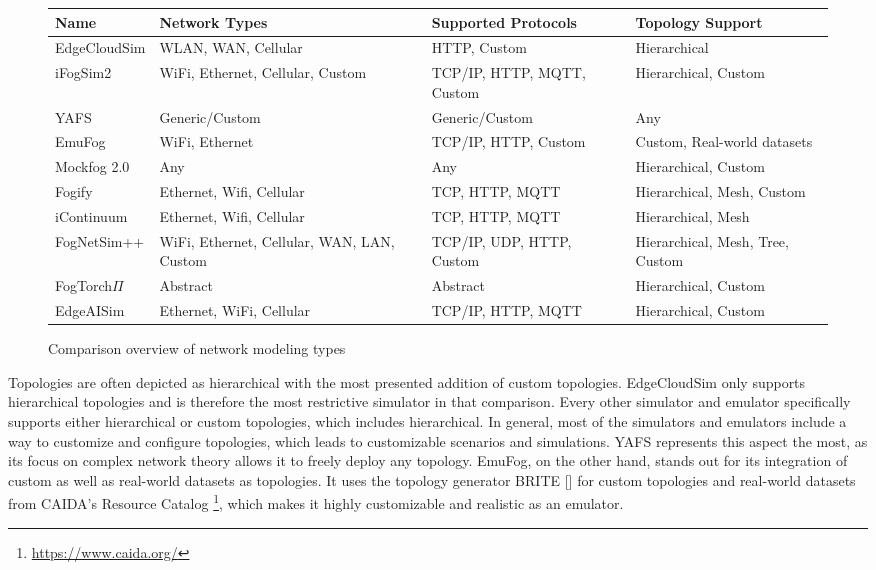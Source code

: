 \begin{figure}[H]
  \centering
  \begin{tabularx}{\textwidth}{ l | X | X | X  }
    \hline
    \textbf{Name} & \textbf{Network Types} & \textbf{Supported Protocols} & \textbf{Topology Support}\\
    \hline\hline
    EdgeCloudSim  & WLAN, WAN, Cellular                         & HTTP, Custom                            & Hierarchical \\\hline
    iFogSim2      & WiFi, Ethernet, Cellular, Custom            & TCP/IP, HTTP, MQTT, Custom              & Hierarchical, Custom\\\hline
    YAFS          & Generic/Custom                              & Generic/Custom                          & Any \\\hline
    EmuFog        & WiFi, Ethernet                              & TCP/IP, HTTP, Custom                    & Custom, Real-world datasets\\\hline
    Mockfog 2.0   & Any                                         & Any                                     & Hierarchical, Custom \\\hline
    Fogify        & Ethernet, Wifi, Cellular                    & TCP, HTTP, MQTT                         & Hierarchical, Mesh, Custom \\\hline
    iContinuum    & Ethernet, Wifi, Cellular                    & TCP, HTTP, MQTT                         & Hierarchical, Mesh \\\hline
    FogNetSim++   & WiFi, Ethernet, Cellular, WAN, LAN, Custom  & TCP/IP, UDP, HTTP, Custom               & Hierarchical, Mesh, Tree, Custom \\\hline
    FogTorch$\Pi$ & Abstract                                    & Abstract                                & Hierarchical, Custom \\\hline
    EdgeAISim     & Ethernet, WiFi, Cellular                    & TCP/IP, HTTP, MQTT                      & Hierarchical, Custom \\\hline
  \end{tabularx}
  \caption{Comparison overview of network modeling types}
  \label{tab:analysis-network-modeling-types}
\end{figure}

Topologies are often depicted as hierarchical with the most presented addition of custom topologies.
EdgeCloudSim only supports hierarchical topologies and is therefore the most restrictive simulator in that comparison.
Every other simulator and emulator specifically supports either hierarchical or custom topologies, which includes hierarchical.
In general, most of the simulators and emulators include a way to customize and configure topologies, which leads to customizable scenarios and simulations.
YAFS represents this aspect the most, as its focus on complex network theory allows it to freely deploy any topology.
EmuFog, on the other hand, stands out for its integration of custom as well as real-world datasets as topologies. 
It uses the topology generator BRITE [\cite{BRITE}] for custom topologies and real-world datasets from CAIDA's Resource Catalog \footnote{\url{https://www.caida.org/}}, which makes it highly customizable and realistic as an emulator.

